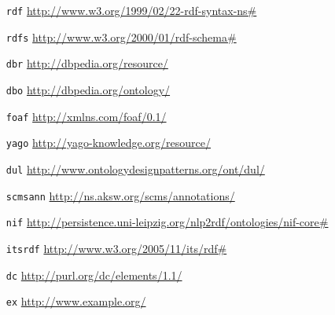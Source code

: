 \begin{itemize}
\item[\texttt{rdf}] \url{http://www.w3.org/1999/02/22-rdf-syntax-ns\#}
\item[\texttt{rdfs}] \url{http://www.w3.org/2000/01/rdf-schema\#}
\item[\texttt{dbr}] \url{http://dbpedia.org/resource/}
\item[\texttt{dbo}] \url{http://dbpedia.org/ontology/}
\item[\texttt{foaf}] \url{http://xmlns.com/foaf/0.1/} 
\item[\texttt{yago}] \url{http://yago-knowledge.org/resource/}
\item[\texttt{dul}] \url{http://www.ontologydesignpatterns.org/ont/dul/}
\item[\texttt{scmsann}] \url{http://ns.aksw.org/scms/annotations/}
\item[\texttt{nif}] \url{http://persistence.uni-leipzig.org/nlp2rdf/ontologies/nif-core\#}
\item[\texttt{itsrdf}] \url{http://www.w3.org/2005/11/its/rdf\#}
\item[\texttt{dc}] \url{http://purl.org/dc/elements/1.1/}
\item[\texttt{ex}] \url{http://www.example.org/}
\end{itemize}
